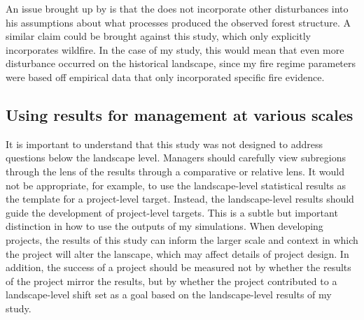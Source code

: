 An issue brought up by \citet{Fule2014} is that the \citep{Baker2014} does not incorporate other disturbances into his assumptions about what processes produced the observed forest structure. A similar claim could be brought against this study, which only explicitly incorporates wildfire. In the case of my study, this would mean that even more disturbance occurred on the historical landscape, since my fire regime parameters were based off empirical data that only incorporated specific fire evidence.


\subsection{Using results for management at various scales}
It is important to understand that this study was not designed to address questions below the landscape level. Managers should carefully view subregions through the lens of the results through a comparative or relative lens. It would not be appropriate, for example, to use the landscape-level statistical results as the template for a project-level target. Instead, the landscape-level results should guide the development of project-level targets. This is a subtle but important distinction in how to use the outputs of my simulations. When developing projects, the results of this study can inform the larger scale and context in which the project will alter the lanscape, which may affect details of project design. In addition, the success of a project should be measured not by whether the results of the project mirror the results, but by whether the project contributed to a landscape-level shift set as a goal based on the landscape-level results of my study.

